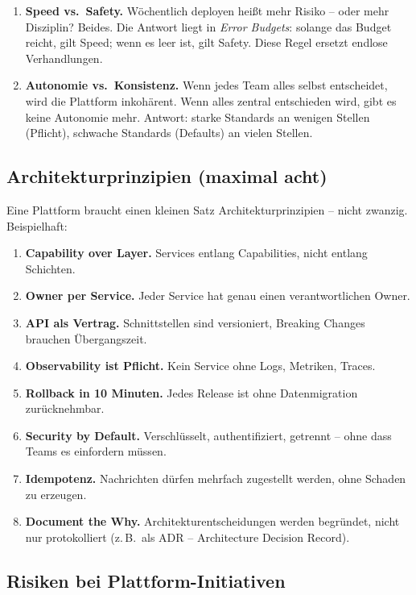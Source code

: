 \documentclass[11pt,a4paper,oneside]{article}
\begin{document}
\begin{enumerate}
  \item \textbf{Speed vs.\ Safety.} Wöchentlich deployen heißt mehr Risiko -- oder mehr Disziplin? Beides. Die Antwort liegt in \emph{Error Budgets}: solange das Budget reicht, gilt Speed; wenn es leer ist, gilt Safety. Diese Regel ersetzt endlose Verhandlungen.
  \item \textbf{Autonomie vs.\ Konsistenz.} Wenn jedes Team alles selbst entscheidet, wird die Plattform inkohärent. Wenn alles zentral entschieden wird, gibt es keine Autonomie mehr. Antwort: starke Standards an wenigen Stellen (Pflicht), schwache Standards (Defaults) an vielen Stellen.
\end{enumerate}

\subsection{Architekturprinzipien (maximal acht)}

Eine Plattform braucht einen kleinen Satz Architekturprinzipien -- nicht zwanzig. Beispielhaft:

\begin{enumerate}
  \item \textbf{Capability over Layer.} Services entlang Capabilities, nicht entlang Schichten.
  \item \textbf{Owner per Service.} Jeder Service hat genau einen verantwortlichen Owner.
  \item \textbf{API als Vertrag.} Schnittstellen sind versioniert, Breaking Changes brauchen Übergangszeit.
  \item \textbf{Observability ist Pflicht.} Kein Service ohne Logs, Metriken, Traces.
  \item \textbf{Rollback in 10 Minuten.} Jedes Release ist ohne Datenmigration zurücknehmbar.
  \item \textbf{Security by Default.} Verschlüsselt, authentifiziert, getrennt -- ohne dass Teams es einfordern müssen.
  \item \textbf{Idempotenz.} Nachrichten dürfen mehrfach zugestellt werden, ohne Schaden zu erzeugen.
  \item \textbf{Document the Why.} Architekturentscheidungen werden begründet, nicht nur protokolliert (z.\,B.\ als ADR -- Architecture Decision Record).
\end{enumerate}

\subsection{Risiken bei Plattform-Initiativen}
\end{document}
